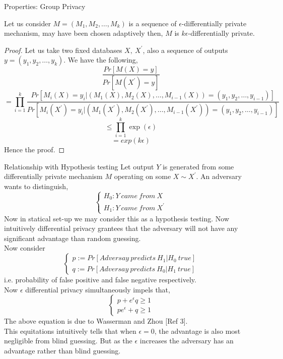 \documentclass[aspectratio=169]{beamer}
\begin{document}
\begin{frame}[allowframebreaks]{Properties: Group Privacy}
\begin{theorem}
Let us consider $M=(M_1, M_2, \dots, M_k)$ is a sequence of $\epsilon$-differentially private mechanism, may have been chosen adaptively then, $M$ is $k\epsilon$-differentially private.
\end{theorem}

\begin{proof}
Let us take two fixed databases $X, \: X^\prime$, also a sequence of outputs $y=(y_1, y_2, \dots, y_k)$. We have the following,
$$\frac{Pr[M(X)=y]}{Pr[M(X^\prime)=y]}$$
$$=\prod_{i=1}^{k} \frac{Pr[M_i(X)=y_i|(M_1(X), M_2(X), \dots, M_{i-1}(X))=(y_1, y_2, \dots, y_{i-1})]}{Pr[M_i(X^\prime)=y_i|(M_1(X^\prime), M_2(X^\prime), \dots, M_{i-1}(X^\prime))=(y_1, y_2, \dots, y_{i-1})]}$$
$$\leq \prod_{i=1}^{k} \exp(\epsilon)$$
$$=exp(k\epsilon)$$
Hence the proof.
\end{proof}
\end{frame}

\begin{frame}[allowframebreaks]{Relationship with Hypothesis testing}
Let output $Y$ is generated from some differentially private mechanism $M$ operating on some $X \sim X^\prime$. An adversary wants to distinguish,
\[
  \begin{cases}
                      H_0: Y \: came \: from \: X \\
                      H_1: Y \: came \: from \: X^\prime
  \end{cases}
\]
Now in statical set-up we may consider this as a hypothesis testing. Now intuitively differential privacy grantees that the adversary will not have any significant advantage than random guessing.\\
Now consider
\[
  \begin{cases}
                      p:= Pr[Adversay \: predicts \: H_1|H_0 \: true] \\
                      q:= Pr[Adversay \: predicts \: H_0|H_1 \: true]
  \end{cases}
\]
i.e. probability of false positive and false negative respectively.\\
Now $\epsilon$ differential privacy simultaneously impels that,
\[
  \begin{cases}
                      p+e^\epsilon q \geq 1 \\
                      pe^\epsilon + q \geq 1
  \end{cases}
\]
The above equation is due to Wasserman and Zhou [Ref 3].\\
This equitations intuitively tells that when $\epsilon=0$, the advantage is also most negligible from blind guessing. But as the $\epsilon$ increases the adversary has an advantage rather than blind guessing.
\end{frame}
\end{document}
